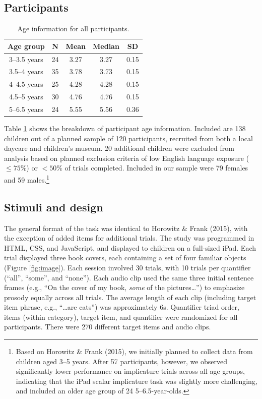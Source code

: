 \documentclass[10pt, letterpaper]{article}
\begin{document}
\subsection{Participants}\label{participants}

\begin{table}[t]
\centering
\begin{tabular}{c c c c c } 
 \hline
 Age group & N & Mean & Median & SD \\
 \hline
 3--3.5 years & 24 & 3.27 & 3.27 & 0.15\\
 3.5--4 years & 35 & 3.78 & 3.73 & 0.15 \\ 
 4--4.5 years & 25 & 4.28 & 4.28 & 0.15\\
 4.5--5 years & 30 & 4.76 & 4.76 & 0.15 \\
 5--6.5 years & 24 & 5.55 & 5.56 & 0.36 \\
 \hline
\end{tabular}
\caption{Age information for all participants.}
\label{tab:age}
\end{table}

Table \ref{tab:age} shows the breakdown of participant age information.
Included are 138 children out of a planned sample of 120 participants,
recruited from both a local daycare and children's museum. 20 additional
children were excluded from analysis based on planned exclusion criteria
of low English language exposure (\(\leq 75\%\)) or \(<50\%\) of trials
completed. Included in our sample were 79 females and 59
males.\footnote{Based on Horowitz \& Frank (2015), we initially planned
  to collect data from children aged 3--5 years. After 57 participants,
  however, we observed significantly lower performance on implicature
  trials across all age groups, indicating that the iPad scalar
  implicature task was slightly more challenging, and included an older
  age group of 24 5--6.5-year-olds.}

\subsection{Stimuli and design}\label{stimuli-and-design}

The general format of the task was identical to Horowitz \& Frank
(2015), with the exception of added items for additional trials. The
study was programmed in HTML, CSS, and JavaScript, and displayed to
children on a full-sized iPad. Each trial displayed three book covers,
each containing a set of four familiar objects (Figure \ref{fig:image}).
Each session involved 30 trials, with 10 trials per quantifier (``all'',
``some'', and ``none''). Each audio clip used the same three initial
sentence frames (e.g., ``On the cover of my book, \emph{some} of the
pictures\ldots{}'') to emphasize prosody equally across all trials. The
average length of each clip (including target item phrase, e.g.,
``\ldots{}are cats'') was approximately 6s. Quantifier triad order,
items (within category), target item, and quantifier were randomized for
all participants. There were 270 different target items and audio clips.
\end{document}
